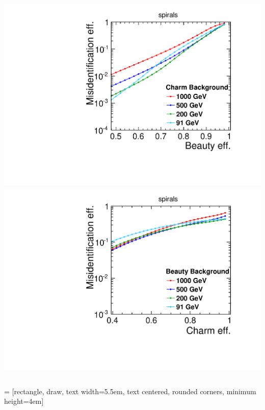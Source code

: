 \begin{frame}
  \begin{columns}
    \centering
    \includegraphics[width=\textwidth]{figures/Global_energies_CLIC_SiD_spirals_Beauty_Charm_.pdf}
    \centering
    \includegraphics[width=\textwidth]{figures/Global_energies_CLIC_SiD_spirals_Charm_Beauty_.pdf}
  \end{columns}

\end{frame}



 = [rectangle, draw, text width=5.5em, text centered, rounded corners, minimum
height=4em]
\usetikzlibrary{backgrounds,fit,decorations.pathreplacing} 

